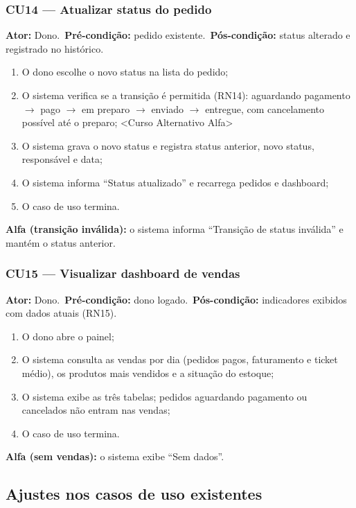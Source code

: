\documentclass[12pt]{article}
\begin{document}
\subsubsection{CU14 --- Atualizar status do pedido}
\textbf{Ator:} Dono.\ \textbf{Pré-condição:} pedido existente.\ \textbf{Pós-condição:} status alterado e registrado no histórico.
\begin{enumerate}[nosep]
\item O dono escolhe o novo status na lista do pedido;
\item O sistema verifica se a transição é permitida (RN14): aguardando pagamento $\rightarrow$ pago $\rightarrow$ em preparo $\rightarrow$ enviado $\rightarrow$ entregue, com cancelamento possível até o preparo; <Curso Alternativo Alfa>
\item O sistema grava o novo status e registra status anterior, novo status, responsável e data;
\item O sistema informa ``Status atualizado'' e recarrega pedidos e dashboard;
\item O caso de uso termina.
\end{enumerate}
\textbf{Alfa (transição inválida):} o sistema informa ``Transição de status inválida'' e mantém o status anterior.

\subsubsection{CU15 --- Visualizar dashboard de vendas}
\textbf{Ator:} Dono.\ \textbf{Pré-condição:} dono logado.\ \textbf{Pós-condição:} indicadores exibidos com dados atuais (RN15).
\begin{enumerate}[nosep]
\item O dono abre o painel;
\item O sistema consulta as vendas por dia (pedidos pagos, faturamento e ticket médio), os produtos mais vendidos e a situação do estoque;
\item O sistema exibe as três tabelas; pedidos aguardando pagamento ou cancelados não entram nas vendas;
\item O caso de uso termina.
\end{enumerate}
\textbf{Alfa (sem vendas):} o sistema exibe ``Sem dados''.

\subsection{Ajustes nos casos de uso existentes}
\label{sec:ajustes}
\end{document}
